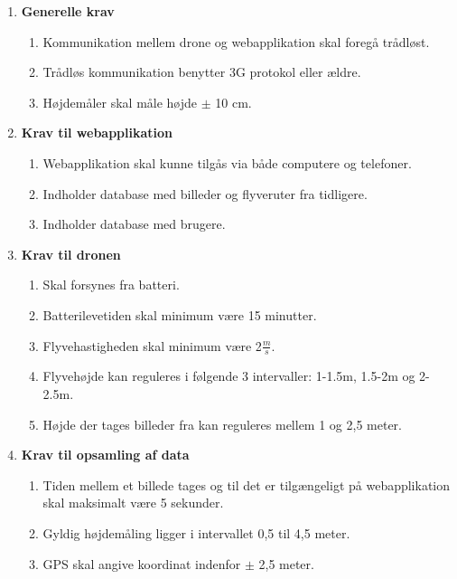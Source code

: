 \begin{enumerate}
\item \textbf{Generelle krav}
	\begin{enumerate}[label*=\arabic*.]
	\item Kommunikation mellem drone og webapplikation skal foregå trådløst.
	\item Trådløs kommunikation benytter 3G protokol eller ældre. 
	\item Højdemåler skal måle højde $\pm$ 10 cm.\\
	\end{enumerate}

\item \textbf{Krav til webapplikation}
	\begin{enumerate}[label*=\arabic*.]
	\item Webapplikation skal kunne tilgås via både computere og telefoner.
	\item Indholder database med billeder og flyveruter fra tidligere.
	\item Indholder database med brugere.\\
	\end{enumerate}	
	

\item \textbf{Krav til dronen}
	\begin{enumerate}[label*=\arabic*.]
	\item Skal forsynes fra batteri.
	\item Batterilevetiden skal minimum være 15 minutter.
	\item Flyvehastigheden skal minimum være 2$\frac{m}{s}$.
	\item Flyvehøjde kan reguleres i følgende 3 intervaller: 1-1.5m, 1.5-2m og 2-2.5m.
	\item Højde der tages billeder fra kan reguleres mellem 1 og 2,5 meter.\\
	
	\end{enumerate}
	
\item \textbf{Krav til opsamling af data}
	\begin{enumerate} [label*=\arabic*.]
	\item Tiden mellem et billede tages og til det er tilgængeligt på webapplikation skal maksimalt være 5 sekunder.	
	\item Gyldig højdemåling ligger i intervallet 0,5 til 4,5 meter. 
	\item GPS skal angive koordinat indenfor $\pm$ 2,5 meter.
	\end{enumerate}
\end{enumerate}
